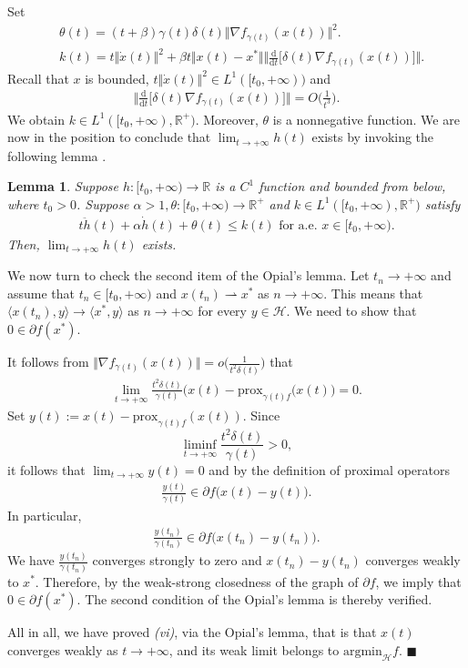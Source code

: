 \documentclass[11pt]{article}
\numberwithin{equation}{section}
\newenvironment{proof}{\bigskip\noindent{\bf Proof.}}{\hfill $\blacksquare$ \par\bigskip\noindent}
\newtheorem{lemma}{Lemma}[section]
\begin{document}
\begin{proof}
Set 
\begin{align*}
    &\theta(t)=(t+\beta)\gamma(t)\delta(t)\Vert \nabla f_{\gamma(t)}(x(t)) \Vert^2.\\
    &k(t)=t\Vert \dot{x}(t) \Vert^2 +\beta t\Vert x(t)-x^* \Vert \Big \Vert \frac{\mathrm{d}}{\mathrm{d}t}\Big[\delta(t)\nabla f_{\gamma(t)}(x(t))\Big] \Big \Vert.
\end{align*}
Recall that $x$ is bounded, $t\Vert \dot{x}(t) \Vert^2 \in L^1([t_0,+\infty))$ and 
\begin{align*}
\Big \Vert \frac{\mathrm{d}}{\mathrm{d}t}\Big[\delta(t)\nabla f_{\gamma(t)}(x(t))\Big] \Big \Vert ={O}\Big(\frac{1}{t^3}\Big). 
\end{align*}
We obtain $k \in L^1([t_0,+\infty),\mathbb{R}^+)$. Moreover, $\theta$ is a nonnegative function. We are now in the position to conclude that $\lim_{t \to +\infty}h(t)$ exists by invoking the following lemma \cite{AttouchPeyp2019b}.
\begin{lemma}
    Suppose $h:[t_0,+\infty) \to \mathbb{R}$ is a $C^1$ function and bounded from below, where $t_0>0$. Suppose $\alpha>1, \theta:[t_0,+\infty) \to \mathbb{R}^+$ and $k \in L^1([t_0,+\infty),\mathbb{R}^+)$ satisfy
    \begin{align*}
        t\ddot{h}(t)+\alpha\dot{h}(t)+\theta(t)\le k(t)   \text{ for a.e. } x \in [t_0, +\infty). 
    \end{align*}
Then, $\lim_{t \to +\infty}h(t)$ exists.
\end{lemma}
\medskip
We now turn to check the second item of the Opial's lemma. Let $t_n \to +\infty$ and assume that $t_n \in [t_0, +\infty)$ and $x(t_n) \rightharpoonup  x^*$ as $n \to +\infty$. This means that $\langle x(t_n),y\rangle \to \langle x^*,y \rangle$ as $n \to +\infty$ for every $y \in \mathcal{H}$. We need to show that $0 \in \partial f(x^*)$.

It follows from $\Big\Vert \nabla f_{\gamma(t)}(x(t)) \Big\Vert=o\Big(\frac{1}{t^2\delta(t)}\Big)$ that
\begin{align*}
    \lim_{t \to +\infty}\frac{t^2\delta(t)}{\gamma(t)}\Big(x(t)-\text{prox}_{\gamma(t)f}(x(t)\Big)=0.
\end{align*}
Set $y(t):=x(t)-\text{prox}_{\gamma(t)f}(x(t))$. Since $$\liminf_{t\to +\infty}\frac{t^2\delta(t)}{\gamma(t)}>0,$$ it follows that $\lim_{t \to +\infty} y(t)=0$ and by the definition of proximal operators
\begin{align*}
    \frac{y(t)}{\gamma(t)} \in  \partial f\Big(x(t)-y(t)\Big).
\end{align*}
In particular, 
\begin{align*}
    \frac{y(t_n)}{\gamma(t_n)} \in  \partial f\Big(x(t_n)-y(t_n)\Big).
\end{align*}
We have $\frac{y(t_n)}{\gamma(t_n)}$ converges strongly to zero and $x(t_n)-y(t_n)$ converges weakly to $x^*$. Therefore, by the weak-strong closedness of the graph of $\partial f$, we imply that $0 \in \partial f(x^*)$. The second condition of the Opial's lemma is thereby verified. 

All in all, we have proved \textit{(vi)}, via the Opial's lemma, that is that $x(t)$ converges weakly as $t \to +\infty$, and its weak limit belongs to $\text{argmin}_{\mathcal{H}}f$.
\end{proof}
\end{document}
